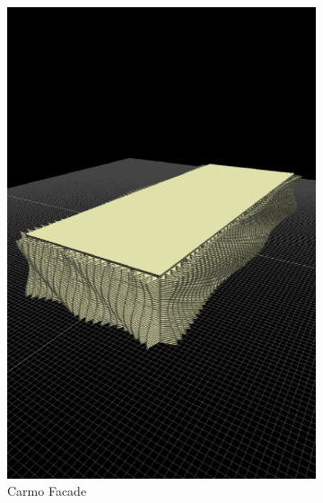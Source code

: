 \begin{figure}
\begin{subfigure}[b]{0.32\linewidth}
    \includegraphics[width=1.0\linewidth]{./images/all_examples/edificio_carmo_crop}
    \caption{Carmo Facade}
    \label{fig:ex:carmo:facade}
  \end{subfigure}
  \begin{subfigure}[b]{0.32\linewidth}

\end{subfigure}
\end{figure}
